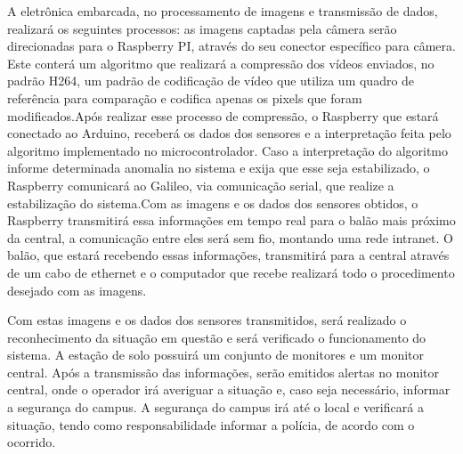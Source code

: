 A eletrônica embarcada, no processamento de imagens e transmissão de dados, realizará os seguintes processos: as imagens captadas pela câmera serão direcionadas para o Raspberry PI, através do seu conector específico para câmera. Este  conterá um algoritmo que realizará a compressão dos vídeos enviados, no padrão H264, um padrão de codificação de vídeo que utiliza um quadro de referência para comparação e codifica apenas os pixels que foram modificados.Após realizar esse processo de compressão, o Raspberry que estará conectado ao Arduino, receberá os dados dos sensores e a interpretação feita pelo algoritmo implementado no microcontrolador. Caso a interpretação do algoritmo informe determinada anomalia no sistema e exija que esse seja estabilizado, o Raspberry comunicará ao Galileo, via comunicação serial, que realize a estabilização do sistema.Com as imagens e os dados dos sensores obtidos, o Raspberry transmitirá essa informações em tempo real para o balão mais próximo da central, a comunicação entre eles será sem fio, montando uma rede intranet. O balão, que estará recebendo essas informações, transmitirá para a central através de um cabo de ethernet e o computador que recebe realizará todo o procedimento desejado com as imagens.

Com estas imagens e os dados dos sensores transmitidos, será realizado o reconhecimento da situação em questão e será verificado o funcionamento do sistema. A estação de solo possuirá um conjunto de monitores e um monitor central. Após a transmissão das informações, serão emitidos alertas no monitor central, onde o operador irá averiguar a situação e, caso seja necessário, informar a segurança do campus. A segurança do campus irá até o local e verificará a situação, tendo como responsabilidade informar a polícia, de acordo com o ocorrido.




